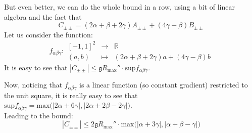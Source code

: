 \documentclass[a4paper,11pt]{article}
\numberwithin{equation}{section}
\theoremstyle{definition}
\begin{document}
But even better, we can do the whole bound in a row, using a bit of linear algebra and the fact that
$$
C_{\pm\pm} = (2\alpha + \beta + 2 \gamma) A_{\pm\pm} + (4\gamma - \beta) B_{\pm\pm}
$$
Let us consider the function:
$$f_{\alpha\beta\gamma}: 
\begin{matrix}
    [-1, 1]^2 & \to & \mathbb{R}\\
    (a,b) & \mapsto & (2\alpha + \beta + 2 \gamma) a + (4\gamma - \beta) b
\end{matrix}$$
It is easy to see that $|C_{\pm\pm}| \leq \mathfrak{g} R_\mathrm{max}'' \cdot \mathrm{sup} f_{\alpha\beta\gamma}$.

Now, noticing that $f_{\alpha\beta\gamma}$ is a linear function (so constant gradient) restricted to the unit square, it is really easy to see that $\mathrm{sup}f_{\alpha\beta\gamma} = \mathrm{max} \big( |2\alpha + 6 \gamma|, |2\alpha + 2\beta - 2 \gamma|\big)$.\\
Leading to the bound:
\begin{equation}
    \boxed{\boxed{ |C_{\pm\pm}| \leq 2 \mathfrak{g} R_\mathrm{max}'' \cdot \mathrm{max}\Big( |\alpha + 3 \gamma|, |\alpha+\beta-\gamma|\Big)}}
\end{equation}
\end{document}
